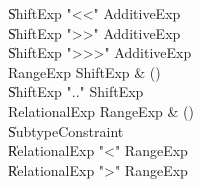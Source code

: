 \begin{bbgrammar}
    \| ShiftExp \xcd"<<" AdditiveExp\\
    \| ShiftExp \xcd">>" AdditiveExp\\
    \| ShiftExp \xcd">>>" AdditiveExp\\
 RangeExp  \label{prod:RangeExp}  \: ShiftExp & ()\\
    \| ShiftExp  \xcd".." ShiftExp \\
 RelationalExp  \label{prod:RelationalExp}  \: RangeExp & ()\\
    \| SubtypeConstraint\\
    \| RelationalExp \xcd"<" RangeExp\\
    \| RelationalExp \xcd">" RangeExp\\
\end{bbgrammar}

